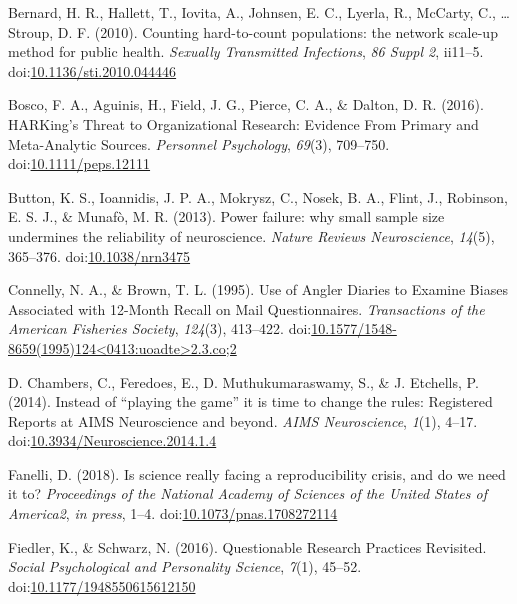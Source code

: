 \documentclass[jou]{apa6}
\theoremstyle{definition}
\theoremstyle{definition}
\theoremstyle{definition}
\theoremstyle{remark}
\begin{document}
\hypertarget{ref-Bernard2010}{}
Bernard, H. R., Hallett, T., Iovita, A., Johnsen, E. C., Lyerla, R.,
McCarty, C., \ldots{} Stroup, D. F. (2010). Counting hard-to-count
populations: the network scale-up method for public health.
\emph{Sexually Transmitted Infections}, \emph{86 Suppl 2}, ii11--5.
doi:\href{https://doi.org/10.1136/sti.2010.044446}{10.1136/sti.2010.044446}

\hypertarget{ref-Bosco2016}{}
Bosco, F. A., Aguinis, H., Field, J. G., Pierce, C. A., \& Dalton, D. R.
(2016). HARKing's Threat to Organizational Research: Evidence From
Primary and Meta-Analytic Sources. \emph{Personnel Psychology},
\emph{69}(3), 709--750.
doi:\href{https://doi.org/10.1111/peps.12111}{10.1111/peps.12111}

\hypertarget{ref-Button2013}{}
Button, K. S., Ioannidis, J. P. A., Mokrysz, C., Nosek, B. A., Flint,
J., Robinson, E. S. J., \& Munafò, M. R. (2013). Power failure: why
small sample size undermines the reliability of neuroscience.
\emph{Nature Reviews Neuroscience}, \emph{14}(5), 365--376.
doi:\href{https://doi.org/10.1038/nrn3475}{10.1038/nrn3475}

\hypertarget{ref-Connelly1995}{}
Connelly, N. A., \& Brown, T. L. (1995). Use of Angler Diaries to
Examine Biases Associated with 12-Month Recall on Mail Questionnaires.
\emph{Transactions of the American Fisheries Society}, \emph{124}(3),
413--422.
doi:\href{https://doi.org/10.1577/1548-8659(1995)124\%3C0413:uoadte\%3E2.3.co;2}{10.1577/1548-8659(1995)124\textless{}0413:uoadte\textgreater{}2.3.co;2}

\hypertarget{ref-Chambers2014}{}
D. Chambers, C., Feredoes, E., D. Muthukumaraswamy, S., \& J. Etchells,
P. (2014). Instead of ``playing the game'' it is time to change the
rules: Registered Reports at AIMS Neuroscience and beyond. \emph{AIMS
Neuroscience}, \emph{1}(1), 4--17.
doi:\href{https://doi.org/10.3934/Neuroscience.2014.1.4}{10.3934/Neuroscience.2014.1.4}

\hypertarget{ref-Fanelli2018}{}
Fanelli, D. (2018). Is science really facing a reproducibility crisis,
and do we need it to? \emph{Proceedings of the National Academy of
Sciences of the United States of America2}, \emph{in press}, 1--4.
doi:\href{https://doi.org/10.1073/pnas.1708272114}{10.1073/pnas.1708272114}

\hypertarget{ref-Fiedler2016}{}
Fiedler, K., \& Schwarz, N. (2016). Questionable Research Practices
Revisited. \emph{Social Psychological and Personality Science},
\emph{7}(1), 45--52.
doi:\href{https://doi.org/10.1177/1948550615612150}{10.1177/1948550615612150}
\end{document}

